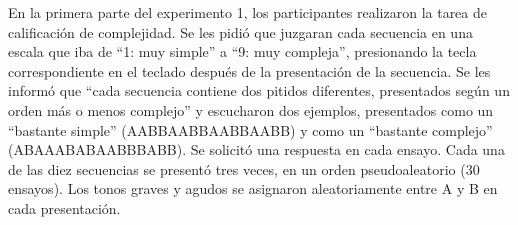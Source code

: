
En la primera parte del experimento 1, los participantes realizaron la tarea de calificación de complejidad. Se les pidió que juzgaran cada secuencia en una escala que iba de ``1: muy simple'' a ``9: muy compleja'', presionando la tecla correspondiente en el teclado después de la presentación de la secuencia. Se les informó que ``cada secuencia contiene dos pitidos diferentes, presentados según un orden más o menos complejo'' y escucharon dos ejemplos, presentados como un ``bastante simple'' (AABBAABBAABBAABB) y como un ``bastante complejo'' (ABAAABABAABBBABB). Se solicitó una respuesta en cada ensayo. Cada una de las diez secuencias se presentó tres veces, en un orden pseudoaleatorio (30 ensayos). Los tonos graves y agudos se asignaron aleatoriamente entre A y B en cada presentación.


